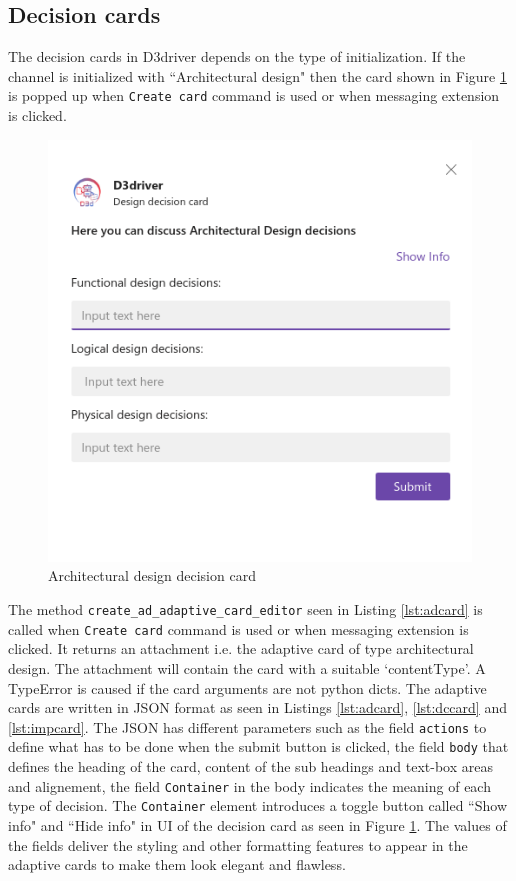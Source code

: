 \subsection{Decision cards}
The decision cards in D3driver depends on the type of initialization. If the channel is initialized with ``Architectural design" then the card shown in Figure \ref{fig:ad} is popped up when \texttt{Create card} command is used or when messaging extension is clicked.

\begin{figure}[h]
\centering
\includegraphics[width=0.6\linewidth]{figures/ad}
\captionsetup{justification=centering}
\caption{Architectural design decision card}
\label{fig:ad}
\end{figure}

The method \texttt{create\_ad\_adaptive\_card\_editor} seen in Listing \ref{lst:adcard} is called when \texttt{Create card} command is used or when messaging extension is clicked. It returns an attachment i.e. the adaptive card of type architectural design. The attachment will contain the card with a suitable `contentType'. A TypeError is caused if the card arguments are not python dicts. The adaptive cards are written in JSON format as seen in Listings \ref{lst:adcard}, \ref{lst:dccard} and \ref{lst:impcard}. The JSON has different parameters such as the field \texttt{actions} to define what has to be done when the submit button is clicked, the field \texttt{body} that defines the heading of the card, content of the sub headings and text-box areas and alignement, the field \texttt{Container} in the body indicates the meaning of each type of decision. The \texttt{Container} element introduces a toggle button called ``Show info" and ``Hide info" in UI of the decision card as seen in Figure \ref{fig:ad}. The values of the fields deliver the styling and other formatting features to appear in the adaptive cards to make them look elegant and flawless.


